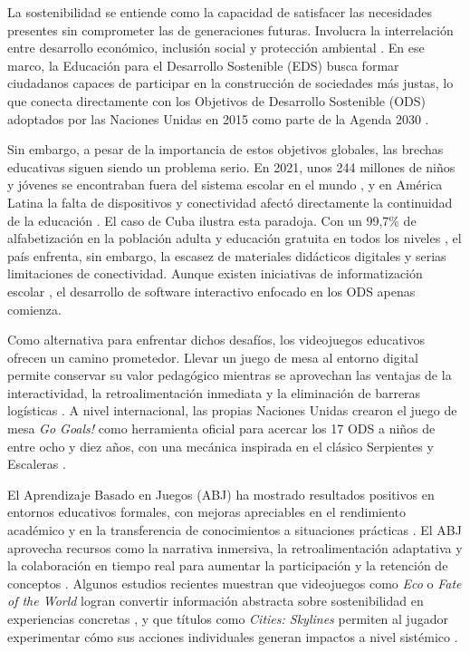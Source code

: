 \documentclass[12pt,a4paper]{article}
\begin{document}
La sostenibilidad se entiende como la capacidad de satisfacer las necesidades presentes sin comprometer las de generaciones futuras. Involucra la interrelación entre desarrollo económico, inclusión social y protección ambiental \citep{WCED1987}. En ese marco, la Educación para el Desarrollo Sostenible (EDS) busca formar ciudadanos capaces de participar en la construcción de sociedades más justas, lo que conecta directamente con los Objetivos de Desarrollo Sostenible (ODS) adoptados por las Naciones Unidas en 2015 como parte de la Agenda 2030 \citep{NacionesUnidas2015, UNESCO2020EDS}.

Sin embargo, a pesar de la importancia de estos objetivos globales, las brechas educativas siguen siendo un problema serio. En 2021, unos 244 millones de niños y jóvenes se encontraban fuera del sistema escolar en el mundo \citep{GlobalEduReport2022}, y en América Latina la falta de dispositivos y conectividad afectó directamente la continuidad de la educación \citep{BancoMundial2025}. El caso de Cuba ilustra esta paradoja. Con un 99,7\% de alfabetización en la población adulta \citep{UNESCO2023} y educación gratuita en todos los niveles \citep{CubaConstitucion2019}, el país enfrenta, sin embargo, la escasez de materiales didácticos digitales y serias limitaciones de conectividad. Aunque existen iniciativas de informatización escolar \citep{InformeVoluntarioCuba2021}, el desarrollo de software interactivo enfocado en los ODS apenas comienza.

Como alternativa para enfrentar dichos desafíos, los videojuegos educativos ofrecen un camino prometedor. Llevar un juego de mesa al entorno digital permite conservar su valor pedagógico mientras se aprovechan las ventajas de la interactividad, la retroalimentación inmediata y la eliminación de barreras logísticas \citep{MartinezGimenes2023}. A nivel internacional, las propias Naciones Unidas crearon el juego de mesa \textit{Go Goals!} como herramienta oficial para acercar los 17 ODS a niños de entre ocho y diez años, con una mecánica inspirada en el clásico Serpientes y Escaleras \citep{GoGoals2020}.

El Aprendizaje Basado en Juegos (ABJ) ha mostrado resultados positivos en entornos educativos formales, con mejoras apreciables en el rendimiento académico y en la transferencia de conocimientos a situaciones prácticas \citep{AguileraRoock2022}. El ABJ aprovecha recursos como la narrativa inmersiva, la retroalimentación adaptativa y la colaboración en tiempo real para aumentar la participación y la retención de conceptos \citep{Mabalay2025}. Algunos estudios recientes muestran que videojuegos como \textit{Eco} o \textit{Fate of the World} logran convertir información abstracta sobre sostenibilidad en experiencias concretas \citep{FernandezGaleote2021, FloodCradock2024}, y que títulos como \textit{Cities: Skylines} permiten al jugador experimentar cómo sus acciones individuales generan impactos a nivel sistémico \citep{Hawlitschek2022}.
\end{document}
